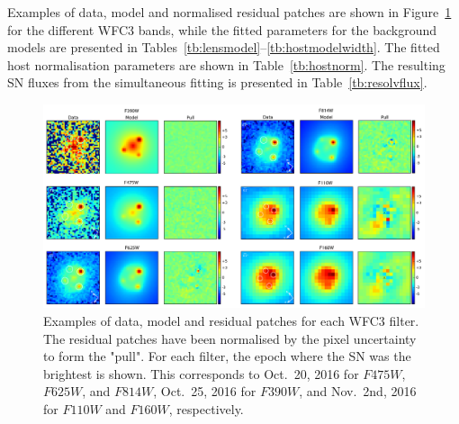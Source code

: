 \documentclass[a4paper,fleqn,usenatbib]{mnras}
\newcommand{\sn}{SN\xspace}
\newcommand{\wfc}{WFC3\xspace}
\newcommand{\wfcir}{WFC3/IR\xspace}
\newcommand{\hstu}{$F390W$\xspace}
\newcommand{\hstb}{$F475W$\xspace}
\newcommand{\hstr}{$F625W$\xspace}
\newcommand{\hsti}{$F814W$\xspace}
\newcommand{\hstj}{$F110W$\xspace}
\newcommand{\hsth}{$F160W$\xspace}
\begin{document}
Examples of data, model and normalised residual patches are shown in Figure~\ref{fig:wfcforward} for the different \wfc bands, while 
the fitted parameters for the background models are presented in Tables~\ref{tb:lensmodel}--\ref{tb:hostmodelwidth}.  The fitted host
 normalisation parameters are shown in Table~\ref{tb:hostnorm}.  The resulting \sn fluxes from the simultaneous fitting is presented 
in Table~\ref{tb:resolvflux}.

\begin{figure}
	\centering
	\caption{%
		Examples of data, model and residual patches for each \wfc filter.  The residual patches have been normalised by the 
		pixel uncertainty to form the "pull".  For each filter, the epoch where the \sn was the brightest is shown.  This corresponds
		to Oct.~20, 2016 for \hstb, \hstr, and \hsti, Oct.~25, 2016 for \hstu, and Nov.~2nd, 2016 for \hstj and \hsth, respectively.
	\label{fig:wfcforward}}
	\includegraphics[width=\textwidth]{wfc3_patches.pdf}
\end{figure}

\begin{table}
	\centering
	\caption{%
		The fitted normalisation parameter, $h$, for the host model in eq.~\eqref{eq:host} for the \wfcir bands.  In this case
		the parameters $a_i, b_i$ are kept fixed to the values obtained for the NIRC2 $J$ and $H$ bands,
		respectively.
		\label{tb:hostnorm}}
    
\end{table}
\end{document}
